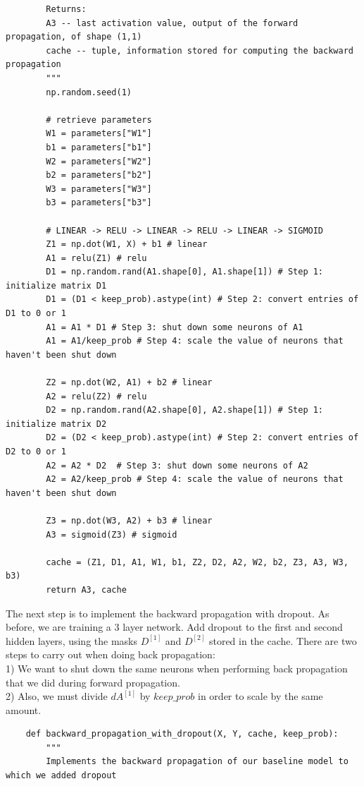 \documentclass[11pt, a4paper]{article}
\begin{document}
\begin{spacing}{1.1}
\begin{lstlisting}
		Returns:
		A3 -- last activation value, output of the forward propagation, of shape (1,1)
		cache -- tuple, information stored for computing the backward propagation
		"""
		np.random.seed(1)
		
		# retrieve parameters
		W1 = parameters["W1"]
		b1 = parameters["b1"]
		W2 = parameters["W2"]
		b2 = parameters["b2"]
		W3 = parameters["W3"]
		b3 = parameters["b3"]
		
		# LINEAR -> RELU -> LINEAR -> RELU -> LINEAR -> SIGMOID
		Z1 = np.dot(W1, X) + b1 # linear
		A1 = relu(Z1) # relu
		D1 = np.random.rand(A1.shape[0], A1.shape[1]) # Step 1: initialize matrix D1
		D1 = (D1 < keep_prob).astype(int) # Step 2: convert entries of D1 to 0 or 1
		A1 = A1 * D1 # Step 3: shut down some neurons of A1
		A1 = A1/keep_prob # Step 4: scale the value of neurons that haven't been shut down
		
		Z2 = np.dot(W2, A1) + b2 # linear
		A2 = relu(Z2) # relu
		D2 = np.random.rand(A2.shape[0], A2.shape[1]) # Step 1: initialize matrix D2
		D2 = (D2 < keep_prob).astype(int) # Step 2: convert entries of D2 to 0 or 1
		A2 = A2 * D2  # Step 3: shut down some neurons of A2
		A2 = A2/keep_prob # Step 4: scale the value of neurons that haven't been shut down

		Z3 = np.dot(W3, A2) + b3 # linear
		A3 = sigmoid(Z3) # sigmoid
		
		cache = (Z1, D1, A1, W1, b1, Z2, D2, A2, W2, b2, Z3, A3, W3, b3)
		return A3, cache \end{lstlisting} \vspace*{1mm}
	The next step is to implement the backward propagation with dropout. As before, we are training a 3 layer network. Add dropout to the first and second hidden layers, using the masks $D^{[1]}$ and $D^{[2]}$ stored in the cache. There are two steps to carry out when doing back propagation: \vspace*{1mm} \\ 
	\hspace*{3mm} 1) We want to shut down the same neurons when performing back propagation that we did during \hspace*{8.5mm} forward propagation. \\
	\hspace*{3mm} 2) Also, we must divide $dA^{[1]}$ by $keep\_prob$ in order to scale by the same amount. \newpage

	\begin{lstlisting}
	def backward_propagation_with_dropout(X, Y, cache, keep_prob):
		"""
		Implements the backward propagation of our baseline model to which we added dropout
		

\end{lstlisting}
\end{spacing}
\end{document}
